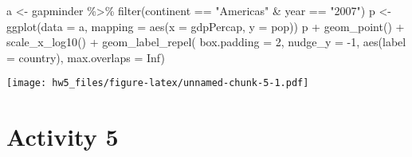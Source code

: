 \documentclass[
]{article}
\newenvironment{Shaded}{\begin{snugshade}}{\end{snugshade}}
\newcommand{\AttributeTok}[1]{\textcolor[rgb]{0.77,0.63,0.00}{#1}}
\newcommand{\ConstantTok}[1]{\textcolor[rgb]{0.00,0.00,0.00}{#1}}
\newcommand{\DecValTok}[1]{\textcolor[rgb]{0.00,0.00,0.81}{#1}}
\newcommand{\FunctionTok}[1]{\textcolor[rgb]{0.00,0.00,0.00}{#1}}
\newcommand{\NormalTok}[1]{#1}
\newcommand{\OtherTok}[1]{\textcolor[rgb]{0.56,0.35,0.01}{#1}}
\newcommand{\SpecialCharTok}[1]{\textcolor[rgb]{0.00,0.00,0.00}{#1}}
\newcommand{\StringTok}[1]{\textcolor[rgb]{0.31,0.60,0.02}{#1}}
\begin{document}
\begin{Shaded}
\begin{Highlighting}[]
\NormalTok{a }\OtherTok{\textless{}{-}}\NormalTok{ gapminder }\SpecialCharTok{\%\textgreater{}\%} \FunctionTok{filter}\NormalTok{(continent }\SpecialCharTok{==} \StringTok{"Americas"} \SpecialCharTok{\&}\NormalTok{ year }\SpecialCharTok{==} \StringTok{"2007"}\NormalTok{)}
\NormalTok{p }\OtherTok{\textless{}{-}} \FunctionTok{ggplot}\NormalTok{(}\AttributeTok{data =}\NormalTok{ a, }\AttributeTok{mapping =} \FunctionTok{aes}\NormalTok{(}\AttributeTok{x =}\NormalTok{ gdpPercap, }\AttributeTok{y =}\NormalTok{ pop))}
\NormalTok{p }\SpecialCharTok{+} \FunctionTok{geom\_point}\NormalTok{() }\SpecialCharTok{+} \FunctionTok{scale\_x\_log10}\NormalTok{() }\SpecialCharTok{+} \FunctionTok{geom\_label\_repel}\NormalTok{(}
    \AttributeTok{box.padding =} \DecValTok{2}\NormalTok{,}
    \AttributeTok{nudge\_y =} \SpecialCharTok{{-}}\DecValTok{1}\NormalTok{,}
    \FunctionTok{aes}\NormalTok{(}\AttributeTok{label =}\NormalTok{ country),}
    \AttributeTok{max.overlaps =} \ConstantTok{Inf}\NormalTok{)}
\end{Highlighting}
\end{Shaded}

\texttt{[image: hw5\_files/figure-latex/unnamed-chunk-5-1.pdf]}

\hypertarget{activity-5}{%
\section{Activity 5}\label{activity-5}}
\end{document}
